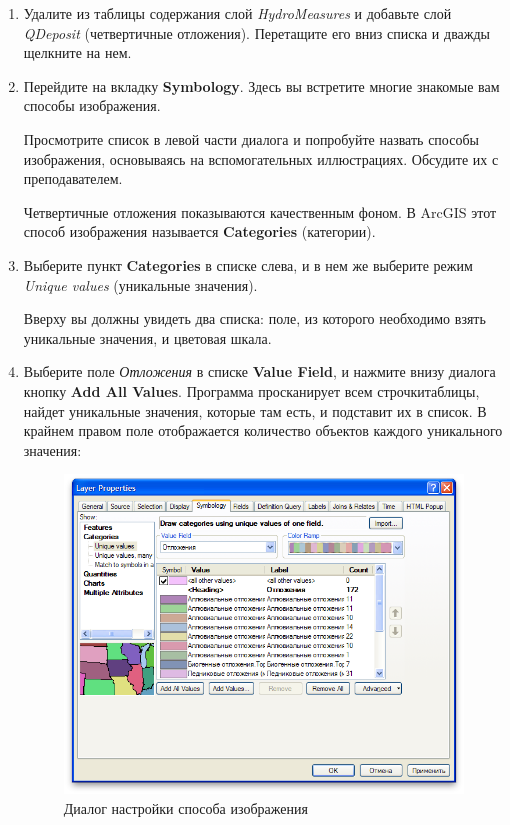 \documentclass[]{book}
\theoremstyle{definition}
\theoremstyle{definition}
\theoremstyle{definition}
\theoremstyle{remark}
\begin{document}
\begin{enumerate}
\def\labelenumi{\arabic{enumi}.}
\item
  Удалите из таблицы содержания слой \emph{HydroMeasures} и добавьте
  слой \emph{QDeposit} (четвертичные отложения). Перетащите его вниз
  списка и дважды щелкните на нем.
\item
  Перейдите на вкладку \textbf{Symbology}. Здесь вы встретите многие
  знакомые вам способы изображения.

  Просмотрите список в левой части диалога и попробуйте назвать способы
  изображения, основываясь на вспомогательных иллюстрациях. Обсудите их
  с преподавателем.

  Четвертичные отложения показываются качественным фоном. В ArcGIS этот
  способ изображения называется \textbf{Categories} (категории).
\item
  Выберите пункт \textbf{Categories} в списке слева, и в нем же выберите
  режим \emph{Unique values} (уникальные значения).

  Вверху вы должны увидеть два списка: поле, из которого необходимо
  взять уникальные значения, и цветовая шкала.
\item
  Выберите поле \emph{Отложения} в списке \textbf{Value Field}, и
  нажмите внизу диалога кнопку \textbf{Add All Values}. Программа
  просканирует всем строчкитаблицы, найдет уникальные значения, которые
  там есть, и подставит их в список. В крайнем правом поле отображается
  количество объектов каждого уникального значения:

  \begin{figure}
  \centering
  \includegraphics{images/Ex03/image15.png}
  \caption{Диалог настройки способа изображения}
  \end{figure}


\end{enumerate}
\end{document}

